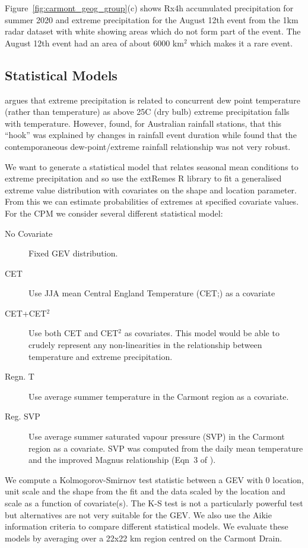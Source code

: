 \documentclass[11pt,a4paper]{article}
\begin{document}
Figure~\ref{fig:carmont_geog_group}(c) shows Rx4h accumulated precipitation for summer 2020 and  extreme precipitation for the August 12th event from the 1km radar dataset with white showing areas which do not form part of the event. The August 12th event had an area of about 6000 km$^2$ which makes it a rare event. 

\subsection{Statistical Models}

\cite{fowler2021rainfall_extremes} argues that extreme precipitation is related to concurrent dew point temperature (rather than temperature) as above 25C (dry bulb) extreme precipitation falls with temperature.  However, \cite{Visser2021hook_precipitation} found, for Australian rainfall stations, that this ``hook'' was explained by changes in rainfall event duration while \cite{Seneviratne2021ippcc_chapter_extremes} found that the contemporaneous dew-point/extreme rainfall relationship was not very robust. 

We want to generate a statistical model that relates seasonal mean conditions to extreme precipitation and so use the extRemes R library\parencite{gilleland2016extremes} to fit a generalised extreme value distribution\parencite{Coles_2001} with covariates on the shape and location parameter. From this we can estimate probabilities of extremes at specified covariate values.   For the CPM we consider several different statistical model:
\begin{description}
	\item[No Covariate] Fixed GEV distribution. 
	\item[CET] Use JJA mean Central England Temperature (CET;\cite{parker92cet}) as a covariate
	\item[CET+CET$^2$] Use both CET and CET$^2$ as covariates. This model would be able to crudely represent any non-linearities in the relationship between temperature and extreme precipitation. 
	\item[Regn. T] Use average summer temperature in the Carmont region as a covariate.
	\item[Reg. SVP] Use average summer saturated vapour pressure (SVP) in the Carmont region as a covariate. SVP was computed from the daily mean temperature and the improved Magnus relationship (Eqn~3 of \cite{Huang2018SVP}).
\end{description}
We compute a Kolmogorov-Smirnov test statistic between a GEV with 0 location, unit scale and the shape from the fit and the data scaled by the location and scale as a function of covariate(s). The K-S test is not a particularly powerful test\parencite{stephens74fit} but alternatives are not very suitable for the GEV. We also use the Aikie information criteria\parencite{akaike74aic} to compare different statistical models.  We evaluate these models by averaging over a 22x22 km region centred on the Carmont Drain.
\end{document}
